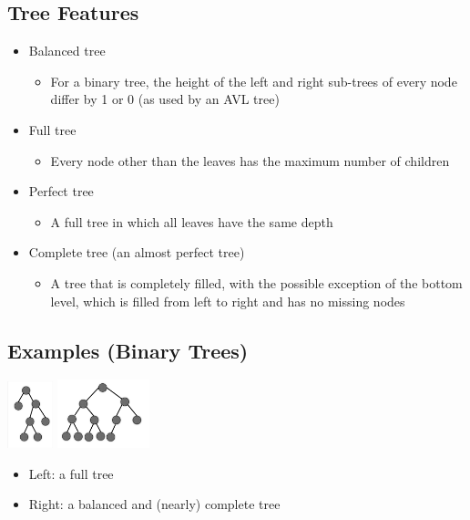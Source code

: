 \documentclass[10pt]{article}
\begin{document}
\subsection*{Tree Features}
\begin{itemize}
    \item Balanced tree
    \begin{itemize}
        \item For a binary tree, the height of the left and right sub-trees of every node differ by 1 or 0 (as used by an AVL tree)
    \end{itemize}
    \item Full tree
    \begin{itemize}
        \item Every node other than the leaves has the maximum number of children
    \end{itemize}
    \item Perfect tree
    \begin{itemize}
        \item A full tree in which all leaves have the same depth
    \end{itemize}
    \item Complete tree (an almost perfect tree)
    \begin{itemize}
        \item A tree that is completely filled, with the possible exception of the bottom level, which is filled from left to right and has no missing nodes
    \end{itemize}
\end{itemize}

\subsection*{Examples (Binary Trees)}
\begin{center}
    \includegraphics[width = 0.1\textwidth]{images/img00008}
    \includegraphics[width = 0.2\textwidth]{images/img00009}
\end{center}
\begin{itemize}
    \item Left: a full tree
    \item Right: a balanced and (nearly) complete tree
\end{itemize}
\end{document}
